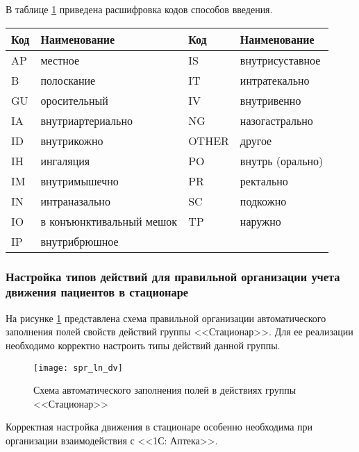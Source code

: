 В таблице \ref{tbl_spr_ln_svv} приведена расшифровка кодов способов введения.

{\small
\begin{table}[ht!]
 \label{tbl_spr_ln_svv} 
 \begin{tabular}{|p{1.9cm}|p{6.2cm}||p{1.9cm}|p{6.2cm}|}
  \hline \rule{0pt}{15pt} \centering \textbf{Код} & \hfil \textbf{Наименование} & \centering \textbf{Код} & \hfil \textbf{Наименование} \\ \hline
  AP &	местное &  IS	& внутрисуставное\\ \hline
  B	& полоскание &  IT	& интратекально  \\ \hline
  GU &	оросительный &   IV	& внутривенно \\ \hline
  IA	& внутриартериально &   NG	& назогастрально  \\ \hline
  ID	& внутрикожно &   OTHER	& другое \\ \hline
  IH	& ингаляция &   PO	& внутрь (орально) \\ \hline
  IM	& внутримышечно &   PR	& ректально \\ \hline
  IN	& интраназально &   SC	& подкожно \\ \hline
  IO	& в конъюнктивальный мешок &   TP	& наружно \\ \hline
  IP	& внутрибрюшное & & \\ \hline
 \end{tabular}
\end{table}
}

\subsubsection{Настройка типов действий для правильной организации учета движения пациентов в стационаре} \label{spr_tpact_dv}

На рисунке \ref{img_spr_ln_dv} представлена схема правильной организации автоматического заполнения полей свойств действий группы <<Стационар>>. Для ее реализации необходимо корректно настроить типы действий данной группы.

\begin{figure}[ht!]\centering
 \texttt{[image: spr\_ln\_dv]}
 \caption{Схема автоматического заполнения полей в действиях группы <<Стационар>>}
 \label{img_spr_ln_dv}
\end{figure}

\begin{vnim}
Корректная настройка движения в стационаре особенно необходима при организации взаимодействия с <<1С: Аптека>>.
\end{vnim}

